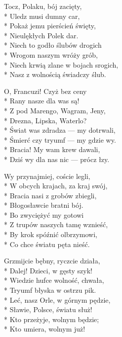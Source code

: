 \begin{lyrics}[longestline={Niech krwią zlane w bojach srogich,}]
\chorusref

Tocz, Polaku, bój zacięty,\\*
Uledz musi dumny car,\\*
Pokaż jemu pierścień święty,\\*
Nieulękłych Polek dar.\\*
Niech to godło ślubów drogich\\*
Wrogom naszym wróży grób,\\*
Niech krwią zlane w bojach srogich,\\*
Nasz z wolnością świadczy ślub.

\chorusref

O, Francuzi! Czyż bez ceny\\*
Rany nasze dla was są!\\*
Z pod Marengo, Wagram, Jeny,\\*
Drezna, Lipska, Waterlo?\\*
Świat was zdradza — my dotrwali,\\*
Śmierć czy tryumf — my gdzie wy.\\*
Bracia! My wam krew dawali,\\*
Dziś wy dla nas nic — prócz łzy.

\chorusref

Wy przynajmiej, coście legli,\\*
W obcych krajach, za kraj swój,\\*
Bracia nasi z grobów zbiegli,\\*
Błogosławcie bratni bój.\\*
Bo zwyciężyć my gotowi\\*
Z trupów naszych tamę wznieść,\\*
By krok spóźnić olbrzymowi,\\*
Co chce światu pęta nieść.

\chorusref

Grzmijcie bębny, ryczcie działa,\\*
Dalej! Dzieci, w gęsty szyk!\\*
Wiedzie hufce wolność, chwała,\\*
Tryumf błyska w ostrzu pik.\\*
Leć, nasz Orle, w górnym pędzie,\\*
Sławie, Polsce, światu służ!\\*
Kto przeżyje, wolnym będzie;\\*
Kto umiera, wolnym już!

\chorusref
\end{lyrics}



